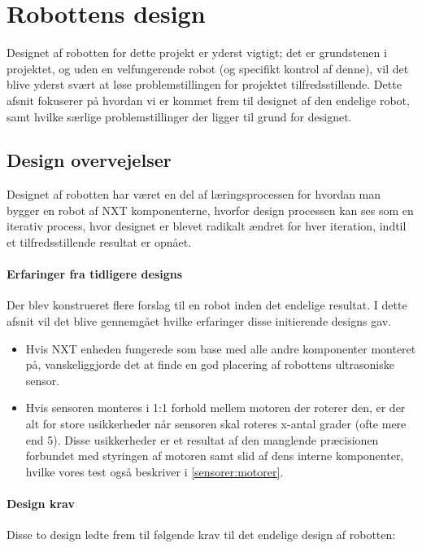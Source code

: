 \section{Robottens design}
Designet af robotten for dette projekt er yderst vigtigt; det er grundstenen i projektet, og uden en velfungerende robot (og specifikt kontrol af denne), vil det blive yderst svært at løse problemstillingen for projektet tilfredsstillende.
Dette afsnit fokuserer på hvordan vi er kommet frem til designet af den endelige robot, samt hvilke særlige problemstillinger der ligger til grund for designet.

\subsection{Design overvejelser}\label{robot:design}
Designet af robotten har været en del af læringsprocessen for hvordan man bygger en robot af \lego NXT komponenterne, hvorfor design processen kan ses som en iterativ process, hvor designet er blevet radikalt ændret for hver iteration, indtil et tilfredsstillende resultat er opnået.


\paragraph{Erfaringer fra tidligere designs} 
Der blev konstrueret flere forslag til en robot inden det endelige resultat. 
I dette afsnit vil det blive gennemgået hvilke erfaringer disse initierende designs gav.


\begin{itemize}
\item Hvis NXT enheden fungerede som base med alle andre komponenter monteret på, vanskeliggjorde det at finde en god placering af robottens ultrasoniske sensor.

\item Hvis sensoren monteres i 1:1 forhold mellem motoren der roterer den, er der alt for store usikkerheder når sensoren skal roteres x-antal grader (ofte mere end 5\degree).
Disse usikkerheder er et resultat af den manglende præcisionen forbundet med styringen af motoren samt slid af dens interne komponenter, hvilke vores test også beskriver i \cref{sensorer:motorer}.
\end{itemize}

\paragraph{Design krav}
Disse to design ledte frem til følgende krav til det endelige design af robotten:

